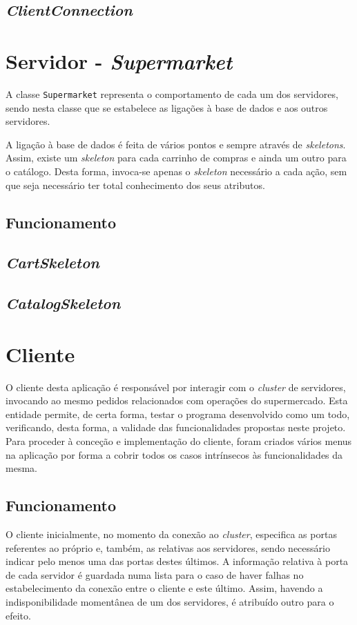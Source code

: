 \documentclass[a4paper]{report}
\begin{document}
{		\subsection{\textit{ClientConnection}} \label{subsec:ClientConnection}
	
	\section{Servidor - \textit{Supermarket}} \label{sec:Server}
		A classe \texttt{Supermarket} representa o comportamento de cada um dos servidores, sendo nesta classe que se estabelece as ligações à base de dados e aos outros servidores.
		
		A ligação à base de dados é feita de vários pontos e sempre através de \textit{skeletons}. Assim, existe um \textit{skeleton} para cada carrinho de compras e ainda um outro para o catálogo.
		Desta forma, invoca-se apenas o \textit{skeleton} necessário a cada ação, sem que seja necessário ter total conhecimento dos seus atributos.

		\subsection{Funcionamento} \label{subsec:ServerWorking}
		\subsection{\textit{CartSkeleton}} \label{subsec:ServerCartSkeleton}
		\subsection{\textit{CatalogSkeleton}} \label{subsec:ServerCatalogSkeleton}
	
	\section{Cliente} \label{sec:Client}
		O cliente desta aplicação é responsável por interagir com o \textit{cluster} de servidores, invocando ao mesmo pedidos relacionados com operações do supermercado.
		Esta entidade permite, de certa forma, testar o programa desenvolvido como um todo, verificando, desta forma, a validade das funcionalidades propostas neste projeto.
		Para proceder à conceção e implementação do cliente, foram criados vários menus na aplicação por forma a cobrir todos os casos intrínsecos às funcionalidades da mesma.

		\subsection{Funcionamento} \label{subsec:ClientWorking}
		O cliente inicialmente, no momento da conexão ao \textit{cluster}, especifica as portas referentes ao próprio e, também, as relativas aos servidores, sendo necessário indicar pelo menos uma das portas destes últimos.
		A informação relativa à porta de cada servidor é guardada numa lista para o caso de haver falhas no estabelecimento da conexão entre o cliente e este último. Assim, havendo a indisponibilidade momentânea de um dos servidores, é atribuído outro para o efeito.

}
\end{document}
